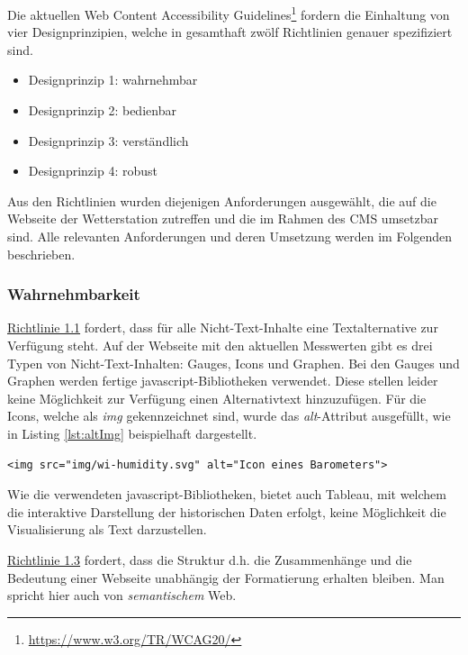 \noindent
Die aktuellen Web Content Accessibility Guidelines\footnote{\url{https://www.w3.org/TR/WCAG20/}} fordern die Einhaltung von vier Designprinzipien, welche in gesamthaft zwölf Richtlinien genauer spezifiziert sind.

\begin{itemize}
\item Designprinzip 1: wahrnehmbar
\item Designprinzip 2: bedienbar
\item Designprinzip 3: verständlich
\item Designprinzip 4: robust
\end{itemize}

\noindent
Aus den Richtlinien wurden diejenigen Anforderungen ausgewählt, die auf die Webseite der Wetterstation zutreffen und die im Rahmen des CMS umsetzbar sind. Alle relevanten Anforderungen und deren Umsetzung werden im Folgenden beschrieben.

\subsubsection{Wahrnehmbarkeit}
\href{https://www.w3.org/Translations/WCAG20-de/#text-equiv}{Richtlinie 1.1} fordert, dass für alle Nicht-Text-Inhalte eine Textalternative zur Verfügung steht. Auf der Webseite mit den aktuellen Messwerten gibt es drei Typen von Nicht-Text-Inhalten: Gauges, Icons und Graphen. Bei den Gauges und Graphen werden fertige javascript-Bibliotheken verwendet. Diese stellen leider keine Möglichkeit zur Verfügung einen Alternativtext hinzuzufügen. Für die Icons, welche als \textit{img} gekennzeichnet sind, wurde das \textit{alt}-Attribut ausgefüllt, wie in Listing \ref{lst:altImg} beispielhaft dargestellt.

\begin{lstlisting}[label=lst:altImg,caption=Alternativtext für Icons, language=HTML5, style=htmlcssjs]
<img src="img/wi-humidity.svg" alt="Icon eines Barometers">
\end{lstlisting}

Wie die verwendeten javascript-Bibliotheken, bietet auch Tableau, mit welchem die interaktive Darstellung der historischen Daten erfolgt, keine Möglichkeit die Visualisierung als Text darzustellen. \newline

\noindent
\href{https://www.w3.org/Translations/WCAG20-de/#text-equiv}{Richtlinie 1.3} fordert, dass die Struktur d.h. die Zusammenhänge und die Bedeutung einer Webseite unabhängig der Formatierung erhalten bleiben. Man spricht hier auch von \textit{semantischem} Web.

